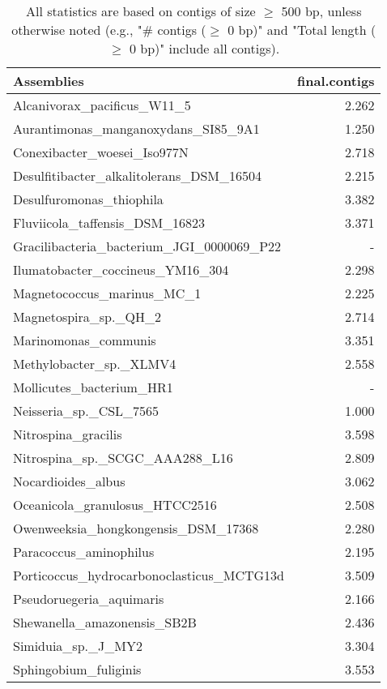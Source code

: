 \documentclass[12pt,a4paper]{article}
\begin{document}
\begin{table}[ht]
\begin{center}
\caption{All statistics are based on contigs of size $\geq$ 500 bp, unless otherwise noted (e.g., "\# contigs ($\geq$ 0 bp)" and "Total length ($\geq$ 0 bp)" include all contigs).}
\begin{tabular}{|l*{1}{|r}|}
\hline
Assemblies & final.contigs \\ \hline
Alcanivorax\_pacificus\_W11\_5 & 2.262 \\ \hline
Aurantimonas\_manganoxydans\_SI85\_9A1 & 1.250 \\ \hline
Conexibacter\_woesei\_Iso977N & 2.718 \\ \hline
Desulfitibacter\_alkalitolerans\_DSM\_16504 & 2.215 \\ \hline
Desulfuromonas\_thiophila & 3.382 \\ \hline
Fluviicola\_taffensis\_DSM\_16823 & 3.371 \\ \hline
Gracilibacteria\_bacterium\_JGI\_0000069\_P22 & - \\ \hline
Ilumatobacter\_coccineus\_YM16\_304 & 2.298 \\ \hline
Magnetococcus\_marinus\_MC\_1 & 2.225 \\ \hline
Magnetospira\_sp.\_QH\_2 & 2.714 \\ \hline
Marinomonas\_communis & 3.351 \\ \hline
Methylobacter\_sp.\_XLMV4 & 2.558 \\ \hline
Mollicutes\_bacterium\_HR1 & - \\ \hline
Neisseria\_sp.\_CSL\_7565 & 1.000 \\ \hline
Nitrospina\_gracilis & 3.598 \\ \hline
Nitrospina\_sp.\_SCGC\_AAA288\_L16 & 2.809 \\ \hline
Nocardioides\_albus & 3.062 \\ \hline
Oceanicola\_granulosus\_HTCC2516 & 2.508 \\ \hline
Owenweeksia\_hongkongensis\_DSM\_17368 & 2.280 \\ \hline
Paracoccus\_aminophilus & 2.195 \\ \hline
Porticoccus\_hydrocarbonoclasticus\_MCTG13d & 3.509 \\ \hline
Pseudoruegeria\_aquimaris & 2.166 \\ \hline
Shewanella\_amazonensis\_SB2B & 2.436 \\ \hline
Simiduia\_sp.\_J\_MY2 & 3.304 \\ \hline
Sphingobium\_fuliginis & 3.553 \\ \hline

\end{tabular}
\end{center}
\end{table}
\end{document}
